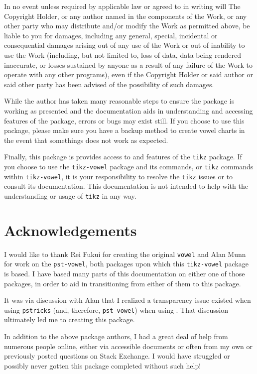 \documentclass{article}
\newcommand{\ignore}[1]{}
\newcommand{\pkg}[1]{\texttt{#1}}
\begin{document}
In no event unless required by applicable law or agreed to in writing will The Copyright Holder, or any author named in the components of the Work, or any other party who may distribute and/or modify the Work as permitted above, be liable to you for damages, including any general, special, incidental or consequential damages arising out of any use of the Work or out of inability to use the Work (including, but not limited to, loss of data, data being rendered inaccurate, or losses sustained by anyone as a result of any failure of the Work to operate with any other programs), even if the Copyright Holder or said author or said other party has been advised of the possibility of such damages.

While the author has taken many reasonable steps to ensure the package is working as presented and the documentation aids in understanding and accessing features of the package, errors or bugs may exist still.  If you choose to use this package, please make sure you have a backup method to create vowel charts in the event that somethings does not work as expected.

Finally, this package is provides access to and features of the \pkg{tikz} package.  If you choose to use the \pkg{tikz-vowel} package and its commands, or \pkg{tikz} commands within \pkg{tikz-vowel}, it is your responsibility to resolve the \pkg{tikz} issues or to consult its documentation.  This documentation is not intended to help with the understanding or usage of \pkg{tikz} in any way.


\section{Acknowledgements}
\label{sec:Acknowledgements}
I would like to thank Rei Fukui for creating the original \pkg{vowel} and Alan Munn for work on the \pkg{pst-vowel}, both packages upon which this \pkg{tikz-vowel} package is based.  I have based many parts of this documentation on either one of those packages, in order to aid in transitioning from either of them to this package.

It was via discussion with Alan that I realized a transparency issue existed when using \pkg{pstricks} (and, therefore, \pkg{pst-vowel}) when using \XeLaTeX.  That discussion ultimately led me to creating this package.

In addition to the above package authors, I had a great deal of help from numerous people online, either via accessible documents or often from my own or previously posted questions on Stack Exchange.  I would have struggled or possibly never gotten this package completed without such help!



\ignore{
			\cardinalvowel{i}{1}
			\cardinalvowel{e}{2}
    			\cardinalvowel{ɛ}{3}
    			\cardinalvowel{a}{4}
    			\cardinalvowel{ɑ}{5}
    			\cardinalvowel{ɔ}{6}
    			\cardinalvowel{o}{7}
    			\cardinalvowel{u}{8}
    			\cardinalvowel{ɨ}{9}
    			\cardinalvowel{ɘ}{10}
   			\cardinalvowel{ə}{11}
   			\cardinalvowel{ɜ}{12}
    			\cardinalvowel{ɪ}{13}
    			\cardinalvowel{ʊ}{14}
    			\cardinalvowel{ɐ}{15}
    			\cardinalvowel{æ}{16}
}%
\end{document}
